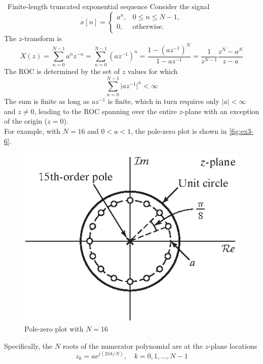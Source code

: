 \begin{ex}{ \ Finite-length truncated exponential sequence}
    Consider the signal 
    \[
    x[n] = 
    \begin{cases}
        a^n,    & 0 \leq n \leq N-1, \\
        0,      & \text{otherwise}.
    \end{cases}
    \]
    The $z$-transform is 
    \[
    X(z) = \sum_{n=0}^{N-1} a^{n}z^{-n} = \sum_{n=0}^{N-1} (az^{-1})^n = \frac{1-(az^{-1})^N}{1-az^{-1}} = \boxed{\frac{1}{z^{N-1}} \frac{z^N - a^N}{z-a}}
    \]
    The ROC is determined by the set of $z$ values for which
    \[
    \sum_{n=0}^{N-1} \lvert az^{-1} \rvert^{n} < \infty
    \]
    The sum is finite as long as $az^{-1}$ is finite, which in turn requires only $\lvert a \rvert < \infty$ and $z \neq 0$, leading to the ROC spanning over the entire $z$-plane with an exception of the origin ($z=0$). \\

    For example, with $N=16$ and $0<a<1$, the pole-zero plot is shown in \autoref{fig:ex3-6}.
    \begin{figure}[H]
        \centering
        \includegraphics{images/example3-6.eps}
        \caption{Pole-zero plot with $N=16$}
        \label{fig:ex3-6}
    \end{figure}
    Specifically, the $N$ roots of the numerator polynomial are at the $z$-plane locations
    \[
    z_{k} = ae^{j(2\pi k/N)}, \quad k=0, 1, ..., N-1
    \]
\end{ex}

